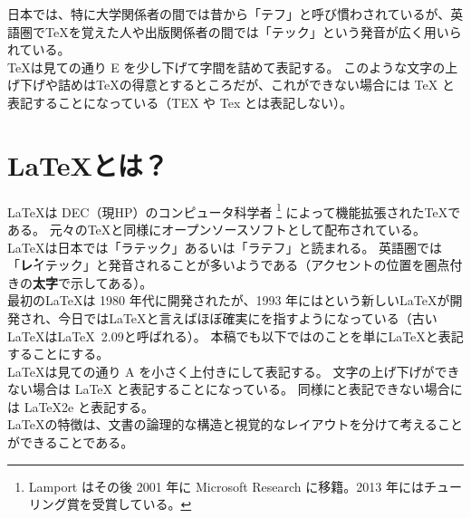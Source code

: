 日本では、特に大学関係者の間では昔から「テフ」と呼び慣わされているが、英語圏で\TeX{}を覚えた人や出版関係者の間では「テック」という発音が広く用いられている。\\

\TeX{}は見ての通り E を少し下げて字間を詰めて表記する。
このような文字の上げ下げや詰めは\TeX{}の得意とするところだが、これができない場合には TeX と表記することになっている（TEX や Tex とは表記しない）。
\section{\LaTeX{}とは？}
\LaTeX{}は DEC（現HP）のコンピュータ科学者  \footnote{Lamport はその後 2001 年に Microsoft Research に移籍。2013 年にはチューリング賞を受賞している。} によって機能拡張された\TeX{}である。
元々の\TeX{}と同様にオープンソースソフトとして配布されている。\\

\LaTeX{}は日本では「ラテック」あるいは「ラテフ」と読まれる。
英語圏では「\textbf{\.レ}イテック」と発音されることが多いようである（アクセントの位置を\.圏\.点付きの\textbf{太字}で示してある）。\\

最初の\LaTeX{}は 1980 年代に開発されたが、1993 年には\LaTeXe{}という新しい\LaTeX{}が開発され、今日では\LaTeX{}と言えばほぼ確実に\LaTeXe{}を指すようになっている（古い\LaTeX{}は{\LaTeX~2.09}と呼ばれる）。
本稿でも以下では\LaTeXe{}のことを単に\LaTeX{}と表記することにする。\\

\LaTeX{}は見ての通り A を小さく上付きにして表記する。
文字の上げ下げができない場合は LaTeX と表記することになっている。
同様に\LaTeXe{}と表記できない場合には LaTeX2e と表記する。\\

\LaTeX{}の特徴は、文書の論理的な構造と視覚的なレイアウトを分けて考えることができることである。\\

